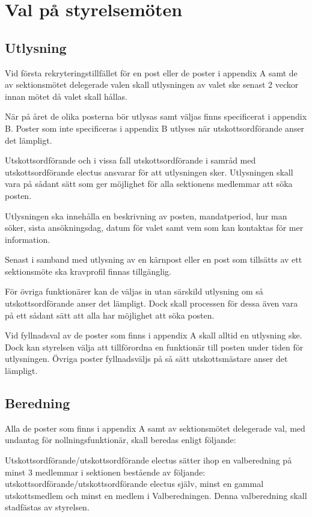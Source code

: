 \documentclass{dsekprotokoll}
\begin{document}
\section{Val på styrelsemöten}

\subsection{Utlysning}
Vid första rekryteringstillfället för en post eller de poster i appendix A samt de av sektionsmötet delegerade valen skall utlysningen av valet ske senast 2 veckor innan mötet då valet skall hållas.

När på året de olika posterna bör utlysas samt väljas finns specificerat i appendix B. Poster som inte specificeras i appendix B utlyses när utskottsordförande anser det lämpligt.

Utskottsordförande och i vissa fall utskottsordförande i samråd med utskottsordförande electus ansvarar för att utlysningen sker. Utlysningen skall vara på sådant sätt som ger möjlighet för alla sektionens medlemmar att söka posten.

Utlysningen ska innehålla en beskrivning av posten, mandatperiod, hur man söker, sista ansökningsdag, datum för valet samt vem som kan kontaktas för mer information.

Senast i samband med utlysning av en kärnpost eller en post som tillsätts av ett sektionsmöte ska kravprofil finnas tillgänglig.

För övriga funktionärer kan de väljas in utan särskild utlysning om så utskottsordförande anser det lämpligt. Dock skall processen för dessa även vara på ett sådant sätt att alla har möjlighet att söka posten.

Vid fyllnadsval av de poster som finns i appendix A skall alltid en utlysning ske. Dock kan styrelsen välja att tillförordna en funktionär till posten under tiden för utlysningen. Övriga poster fyllnadsväljs på så sätt utskottsmästare anser det lämpligt.

\subsection{Beredning}

Alla de poster som finns i appendix A samt av sektionsmötet delegerade val, med undantag för nollningsfunktionär, skall beredas enligt följande:

Utskottsordförande/utskottsordförande electus sätter ihop en valberedning på minst 3 medlemmar i sektionen bestående av följande: utskottsordförande/utskottsordförande electus själv, minst en gammal utskottsmedlem och minst en medlem i Valberedningen. Denna valberedning skall stadfästas av styrelsen.
\end{document}
